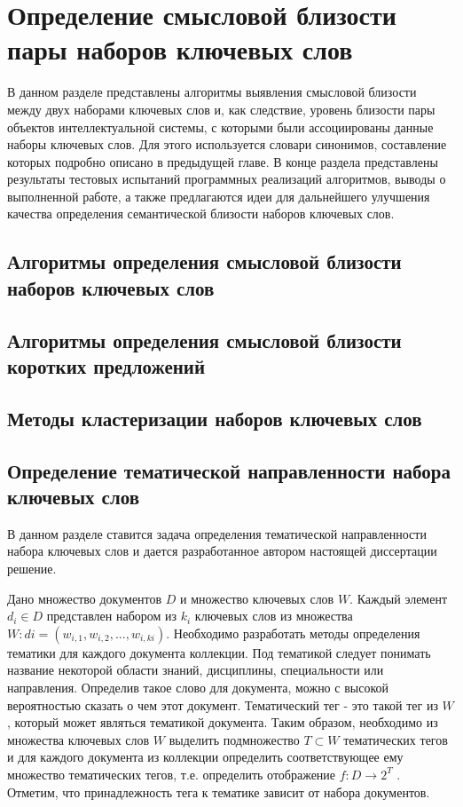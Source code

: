 \chapter{Определение смысловой близости пары наборов ключевых слов}
В данном разделе представлены алгоритмы выявления смысловой близости между двух наборами ключевых слов и, как следствие, уровень близости пары объектов интеллектуальной системы, с которыми были ассоциированы данные наборы ключевых слов.
Для этого используется словари синонимов, составление которых подробно описано в предыдущей главе.
В конце раздела представлены результаты тестовых испытаний программных реализаций алгоритмов, выводы о выполненной работе, а также предлагаются идеи для дальнейшего улучшения качества определения семантической близости наборов ключевых слов.

\section{Алгоритмы определения смысловой близости наборов ключевых слов}
\section{Алгоритмы определения смысловой близости коротких предложений}
\section{Методы кластеризации наборов ключевых слов}

\section{Определение тематической направленности набора ключевых слов} \label{theme_tags}
В данном разделе ставится задача определения тематической направленности набора ключевых слов и дается разработанное автором настоящей диссертации решение.

Дано множество документов $D$ и множество ключевых слов $W$. Каждый элемент $d_i \in D$ представлен набором из $k_i$ ключевых слов из множества $W: di = (w_{i,1},w_{i,2},...,w_{i,ki})$. Необходимо разработать методы определения тематики для каждого документа коллекции. Под тематикой следует понимать название некоторой области знаний, дисциплины, специальности или направления. Определив такое слово для документа, можно с высокой вероятностью сказать о чем этот документ. Тематический тег - это такой тег из $W$, который может являться тематикой документа. Таким образом, необходимо из множества ключевых слов $W$ выделить подмножество $T \subset W$ тематических тегов и для каждого документа из коллекции определить соответствующее ему множество тематических тегов, т.е. определить отображение $f : D \rightarrow 2^T$ . Отметим, что принадлежность тега к тематике зависит от набора документов.

